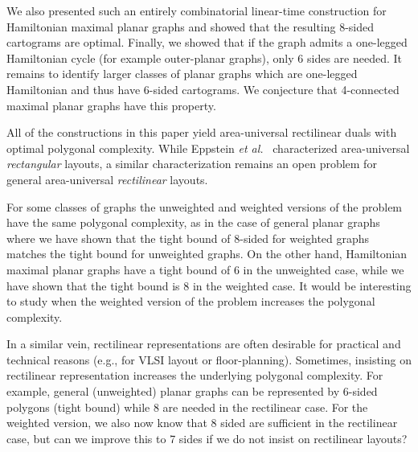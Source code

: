 \documentclass[11pt]{article}
\begin{document}
We also presented such an entirely combinatorial linear-time
construction for Hamiltonian maximal planar graphs and showed that the
resulting 8-sided cartograms are optimal. Finally, we showed that if the graph admits a one-legged Hamiltonian cycle (for example outer-planar graphs), only 6 sides are needed. It remains to identify larger classes
of planar graphs which are one-legged Hamiltonian and thus have 6-sided
cartograms. We conjecture that 4-connected maximal planar graphs have
this property.

All of the constructions in this paper yield area-universal
rectilinear duals with optimal polygonal complexity. While Eppstein
{\em et al.}~\cite{EMVS} characterized area-universal {\em rectangular}
layouts, a similar characterization remains an open problem for general area-universal
{\em rectilinear} layouts.



For some classes of graphs the unweighted and weighted versions of the
problem have the same polygonal complexity, as in the case of general
planar graphs where we have shown that the tight bound of 8-sided for
weighted graphs matches the tight bound for unweighted graphs. On the
other hand, Hamiltonian maximal planar graphs have a tight bound of 6 in the
unweighted case, while we have shown that the tight bound is 8 in the
weighted case. It would be interesting to study when the weighted
version of the problem increases the polygonal complexity.

In a similar vein, rectilinear representations are often desirable for
practical and technical reasons (e.g., for VLSI layout or
floor-planning). Sometimes, insisting on rectilinear representation
increases the underlying polygonal complexity. For example, general
(unweighted) planar graphs can be represented by 6-sided polygons (tight
bound) while 8 are needed in the rectilinear case. For the weighted
version, we also now know that 8 sided are sufficient in the
rectilinear case, but can we improve this to 7 sides if we do not
insist on rectilinear layouts?












{

}
\end{document}
